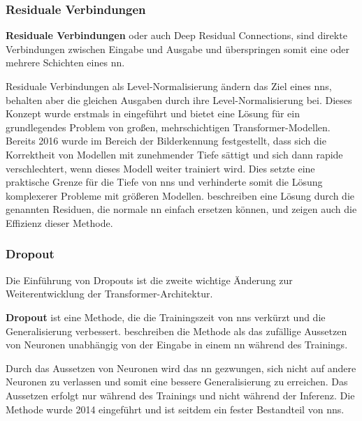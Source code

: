 \subsubsection{Residuale Verbindungen}

\begin{definition}\label{def:residuale-verbindungen}
    \textbf{Residuale Verbindungen} oder auch Deep Residual Connections, sind direkte Verbindungen zwischen Eingabe und Ausgabe und überspringen somit eine oder mehrere Schichten eines \ac{nn}.
\end{definition}
Residuale Verbindungen als Level-Normalisierung ändern das Ziel eines \ac{nn}s, behalten aber die gleichen Ausgaben durch ihre Level-Normalisierung bei.
Dieses Konzept wurde erstmals in \citet{deep_residual} eingeführt und bietet eine Lösung für ein grundlegendes Problem von großen, mehrschichtigen Transformer-Modellen.
Bereits 2016 wurde im Bereich der Bilderkennung festgestellt, dass sich die Korrektheit von Modellen mit zunehmender Tiefe sättigt und sich dann rapide verschlechtert, wenn dieses Modell weiter trainiert wird.
Dies setzte eine praktische Grenze für die Tiefe von \ac{nn}s und verhinderte somit die Lösung komplexerer Probleme mit größeren Modellen.
\citet{deep_residual} beschreiben eine Lösung durch die genannten Residuen, die normale \ac{nn} einfach ersetzen können, und zeigen auch die Effizienz dieser Methode.\\

\subsubsection{Dropout}

Die Einführung von Dropouts ist die zweite wichtige Änderung zur Weiterentwicklung der Transformer-Architektur.
\begin{definition}\label{def:dropout}
    \textbf{Dropout} ist eine Methode, die die Trainingszeit von \ac{nn}s verkürzt und die Generalisierung verbessert.
    \citet{dropout} beschreiben die Methode als das zufällige Aussetzen von Neuronen unabhängig von der Eingabe in einem \ac{nn} während des Trainings. 
\end{definition}
Durch das Aussetzen von Neuronen wird das \ac{nn} gezwungen, sich nicht auf andere Neuronen zu verlassen und somit eine bessere Generalisierung zu erreichen.
Das Aussetzen erfolgt nur während des Trainings und nicht während der Inferenz.
Die Methode wurde 2014 eingeführt und ist seitdem ein fester Bestandteil von \ac{nn}s.\\

